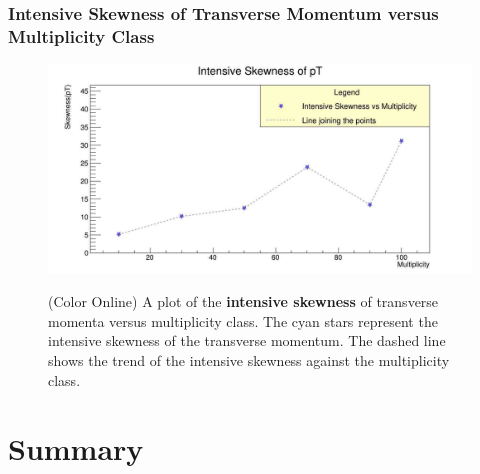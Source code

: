 \documentclass[letterpaper,aps,prc,superscriptaddress,nofootinbib,10pt,showpacs,floatfix]{revtex4-2}%
\begin{document}
\subsubsection{Intensive Skewness of Transverse Momentum versus Multiplicity Class}
\label{subsubsec:intskew}
\vspace{-5mm}
\begin{figure}[!htb]
\begin{minipage}{\textwidth}
   \label{Fig:9}
     \centering
     \renewcommand{\thefigure}{9}
     \includegraphics[width=\linewidth]{intskew}
     \begin{minipage}{0.8\textwidth}
     \caption{(Color Online) A plot of the \textbf{intensive skewness} of transverse momenta versus multiplicity class. The cyan stars represent the intensive skewness of the transverse momentum. The dashed line shows the trend of the intensive skewness against the multiplicity class.}
     \end{minipage}
     
\end{minipage}
\end{figure}






\section{Summary}
\end{document}
